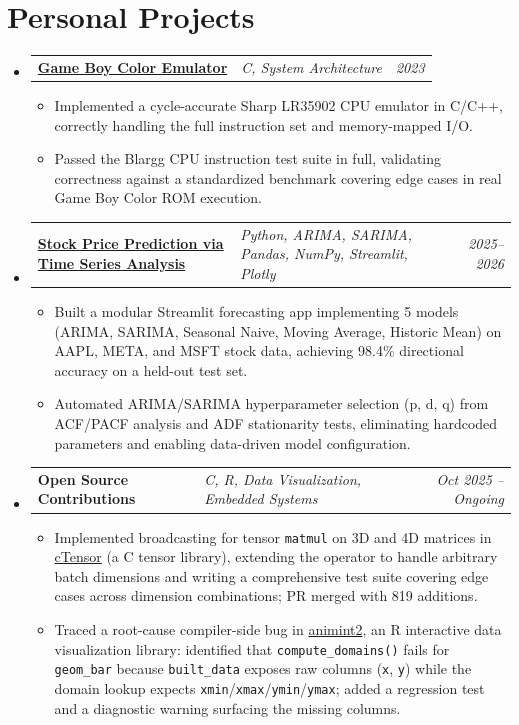 \documentclass[10pt, letterpaper]{article}
\makeatletter
\newcommand{\resumeSubheading}[3]{%
    \item
    \begin{tabularx}{\textwidth}{@{}l X r@{}}
        \textbf{#1} & \textit{\small #2} & \textit{\small #3}
    \end{tabularx}%
}
\makeatother
\begin{document}
\section*{Personal Projects}
\begin{itemize}
    \resumeSubheading
        {\href{https://github.com/AZ9tumas/gbc2}{Game Boy Color Emulator}}
        {C, System Architecture}
        {2023}
    \begin{itemize}
        \item Implemented a cycle-accurate Sharp LR35902 CPU emulator in C/C++, correctly handling the full instruction set and memory-mapped I/O.
        \item Passed the Blargg CPU instruction test suite in full, validating correctness against a standardized benchmark covering edge cases in real Game Boy Color ROM execution.
    \end{itemize}

    \resumeSubheading
        {\href{https://github.com/AZ9tumas/Time-Series-Project}{Stock Price Prediction via Time Series Analysis}}
        {Python, ARIMA, SARIMA, Pandas, NumPy, Streamlit, Plotly}
        {2025--2026}
    \begin{itemize}
        \item Built a modular Streamlit forecasting app implementing 5 models (ARIMA, SARIMA, Seasonal Naive, Moving Average, Historic Mean) on AAPL, META, and MSFT stock data, achieving 98.4\% directional accuracy on a held-out test set.
        \item Automated ARIMA/SARIMA hyperparameter selection (p, d, q) from ACF/PACF analysis and ADF stationarity tests, eliminating hardcoded parameters and enabling data-driven model configuration.
    \end{itemize}
    
     \resumeSubheading
        {Open Source Contributions}
        {C, R, Data Visualization, Embedded Systems}
        {Oct 2025 -- Ongoing}
    \begin{itemize}
        \item Implemented broadcasting for tensor \texttt{matmul} on 3D and 4D matrices in \href{https://github.com/pocketpy/cTensor/pull/45}{cTensor} (a C tensor library), extending the operator to handle arbitrary batch dimensions and writing a comprehensive test suite covering edge cases across dimension combinations; PR merged with 819 additions.
        \item Traced a root-cause compiler-side bug in \href{https://github.com/animint/animint2/pull/319}{animint2}, an R interactive data visualization library: identified that \texttt{compute\_domains()} fails for \texttt{geom\_bar} because \texttt{built\_data} exposes raw columns (\texttt{x}, \texttt{y}) while the domain lookup expects \texttt{xmin}/\texttt{xmax}/\texttt{ymin}/\texttt{ymax}; added a regression test and a diagnostic warning surfacing the missing columns.
    \end{itemize}
\end{itemize}
\end{document}
